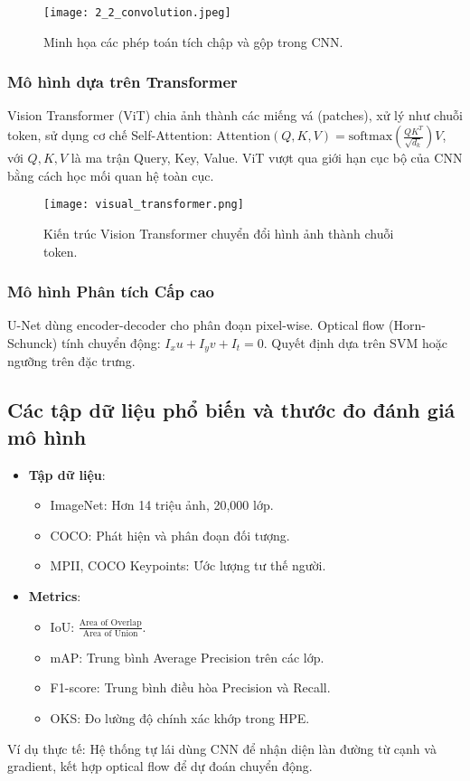 \begin{figure}[h]
    \centering
    \texttt{[image: 2\_2\_convolution.jpeg]}
    \caption{Minh họa các phép toán tích chập và gộp trong CNN.}
    \label{fig:cnn_ops}
\end{figure}

\subsubsection{Mô hình dựa trên Transformer}
Vision Transformer (ViT) chia ảnh thành các miếng vá (patches), xử lý như chuỗi token, sử dụng cơ chế Self-Attention: $\text{Attention}(Q, K, V) = \text{softmax}\left(\frac{QK^T}{\sqrt{d_k}}\right)V$, với $Q, K, V$ là ma trận Query, Key, Value.\autocite{dosovitskiy2021} ViT vượt qua giới hạn cục bộ của CNN bằng cách học mối quan hệ toàn cục.

\begin{figure}[h]
    \centering
    \texttt{[image: visual\_transformer.png]}
    \caption{Kiến trúc Vision Transformer chuyển đổi hình ảnh thành chuỗi token.}
    \label{fig:vit_arch}
\end{figure}

\subsubsection{Mô hình Phân tích Cấp cao}
U-Net dùng encoder-decoder cho phân đoạn pixel-wise.\autocite{ronneberger2015} Optical flow (Horn-Schunck) tính chuyển động: $I_x u + I_y v + I_t = 0$.\autocite{horn1981} Quyết định dựa trên SVM hoặc ngưỡng trên đặc trưng.\autocite{szeliski2010}

\subsection{Các tập dữ liệu phổ biến và thước đo đánh giá mô hình}
\begin{itemize}
    \item \textbf{Tập dữ liệu}:
    \begin{itemize}
        \item ImageNet: Hơn 14 triệu ảnh, 20,000 lớp.\autocite{deng2009}
        \item COCO: Phát hiện và phân đoạn đối tượng.\autocite{lin2014}
        \item MPII, COCO Keypoints: Ước lượng tư thế người.\autocite{lin2014}
    \end{itemize}
    \item \textbf{Metrics}:
    \begin{itemize}
        \item IoU: $\frac{\text{Area of Overlap}}{\text{Area of Union}}$.\autocite{lin2014}
        \item mAP: Trung bình Average Precision trên các lớp.\autocite{lin2014}
        \item F1-score: Trung bình điều hòa Precision và Recall.\autocite{szeliski2010}
        \item OKS: Đo lường độ chính xác khớp trong HPE.\autocite{lin2014}
    \end{itemize}
\end{itemize}

Ví dụ thực tế: Hệ thống tự lái dùng CNN để nhận diện làn đường từ cạnh và gradient, kết hợp optical flow để dự đoán chuyển động.\autocite{redmon2016}

